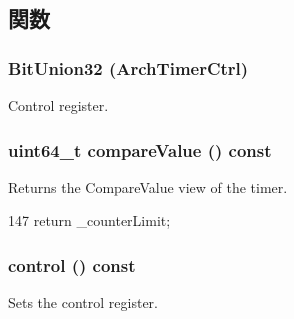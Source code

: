 \subsection{関数}
\hypertarget{classGenericTimer_1_1ArchTimer_a34ca41431610ed97a96ebaee72938bf4}{
\subsubsection[{BitUnion32}]{\setlength{\rightskip}{0pt plus 5cm}BitUnion32 (ArchTimerCtrl)}}
\label{classGenericTimer_1_1ArchTimer_a34ca41431610ed97a96ebaee72938bf4}


Control register. \hypertarget{classGenericTimer_1_1ArchTimer_a695f6515c1ffd9033de3acdde32f5bce}{
\subsubsection[{compareValue}]{\setlength{\rightskip}{0pt plus 5cm}uint64\_\-t compareValue () const}}
\label{classGenericTimer_1_1ArchTimer_a695f6515c1ffd9033de3acdde32f5bce}


Returns the CompareValue view of the timer. 


\begin{DoxyCode}
147 { return _counterLimit; }
\end{DoxyCode}
\hypertarget{classGenericTimer_1_1ArchTimer_a75c980484dfd57725a2378d0958f046c}{
\subsubsection[{control}]{ control () const}}
\label{classGenericTimer_1_1ArchTimer_a75c980484dfd57725a2378d0958f046c}


Sets the control register. 


